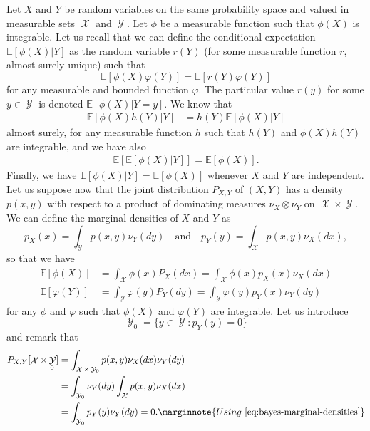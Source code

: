 \documentclass[
	fontsize=11pt, %
	twoside=false, %
	numbers=noenddot, %
]{kaobook}
\DeclareMathOperator{\cX}{{\mathcal X}}
\DeclareMathOperator{\cY}{{\mathcal Y}}
\newcommand{\E}{\mathbb E}
\begin{document}
Let $X$ and $Y$ be random variables on the same probability space and valued in measurable sets $\cX$ and $\cY$.
Let $\phi$ be a measurable function such that $\phi(X)$ is integrable. 
Let us recall that we can define the conditional expectation $\E [\phi(X) | Y]$ as the random variable $r(Y)$ (for some measurable function $r$, almost surely unique) such that
\begin{equation}
	\E[\phi(X) \varphi(Y)] = \E[ r(Y) \varphi(Y)]
\end{equation}
for any measurable and bounded function $\varphi$.
The particular value $r(y)$ for some $y \in \cY$ is denoted $\E[\phi(X) | Y = y]$. 
We know that
\begin{align*}
	\E[\phi(X) h(Y) | Y] &= h(Y) \E[ \phi(X) | Y]
\end{align*}
almost surely, for any measurable function $h$ such that $h(Y)$ and $\phi(X) h(Y)$ are integrable, and we have also
\begin{align}
	\E [\E[ \phi(X) | Y]] = \E[\phi(X)].
\end{align}
Finally, we have $\E[\phi(X) | Y] = \E[\phi(X)]$ whenever $X$ and $Y$ are independent.
Let us suppose now that the joint distribution $P_{X, Y}$ of $(X, Y)$ has a density $p(x, y)$ with respect to a product of dominating measures $\nu_X \otimes \nu_Y$ on $\cX \times \cY$.
We can define the marginal densities of $X$ and $Y$ as
\begin{equation}
	\label{eq:bayes-marginal-densities}
	p_X(x) = \int_{\cY} p(x, y) \nu_Y(d y) \quad \text{and} \quad
	p_Y(y) = \int_{\cX} p(x, y) \nu_X(d x),
\end{equation}
so that we have
\begin{align*}
	\E[\phi(X)] &= \int_{\cX} \phi(x) P_X(dx) = \int_{\cX} \phi(x) p_X(x) \nu_X(dx) \\ 
	\E[\varphi(Y)] &= \int_{\cY} \varphi(y) P_Y(dy) = \int_{\cY} \varphi(y) p_Y(x) \nu_Y(dy)
\end{align*}
for any $\phi$ and $\varphi$ such that $\phi(X)$ and $\varphi(Y)$ are integrable. 
Let us introduce 
\begin{equation*}
	\cY_0 = \big\{ y \in \cY : p_Y(y) = 0 \big\}
\end{equation*}
and remark that
\begin{align*}
	P_{X, Y} [ \cX \times \cY_0 ] 
	&= \int_{\cX \times \cY_0} p(x, y) \nu_X(dx) \nu_Y(dy) \\
	&= \int_{\cY_0} \nu_Y(dy) \int_{\cX} p(x, y) \nu_X (dx) \\
	&= \int_{\cY_0} p_Y(y) \nu_Y(dy) = 0.
	\marginnote{Using~\eqref{eq:bayes-marginal-densities}}
\end{align*}
\end{document}
